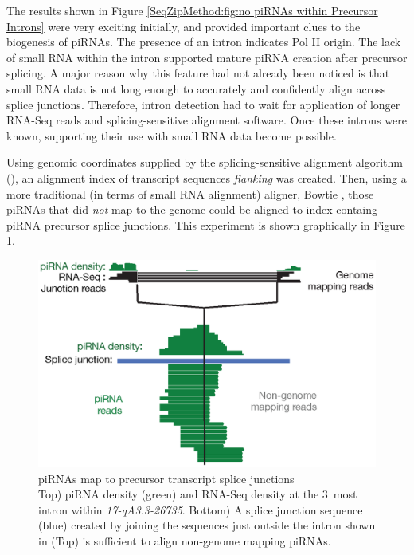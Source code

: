   The results shown in Figure \ref{SeqZipMethod:fig:no piRNAs within Precursor Introns} were very exciting initially, and provided important clues to the biogenesis of piRNAs. The presence of an intron indicates Pol II origin. The lack of small RNA within the intron supported mature piRNA creation after precursor splicing. A major reason why this feature had not already been noticed is that small RNA data is not long enough to accurately and confidently align across splice junctions. Therefore, intron detection had to wait for application of longer RNA-Seq reads and splicing-sensitive alignment software. Once these introns were known, supporting their use with small RNA data become possible.

  Using genomic coordinates supplied by the splicing-sensitive alignment algorithm (\citep{Trapnell2009}), an alignment index of transcript sequences \textit{flanking} was created. Then, using a more traditional (in terms of small RNA alignment) aligner, Bowtie \citep{Langmead2009}, those piRNAs that did \textit{not} map to the genome could be aligned to index containg piRNA precursor splice junctions. This experiment is shown graphically in Figure \ref{SeqZipMethod:fig: piRNAs map to SJ}.

  \begin{figure} %
    \centering 
    \includegraphics{Figures/SeqZipMethod/smallRNAsMapToPrecursorSJ.eps}
    \caption[piRNAs map to precursor transcript splice junctions]
    {
      piRNAs map to precursor transcript splice junctions\\[0.25cm]
      Top) piRNA density (green) and RNA-Seq density at the 3\textprime~most intron within \textit{17-qA3.3-26735}. Bottom) A splice junction sequence (blue) created by joining the sequences just outside the intron shown in (Top) is sufficient to align non-genome mapping piRNAs.
      }
    \label{SeqZipMethod:fig: piRNAs map to SJ}
    \end{figure}

